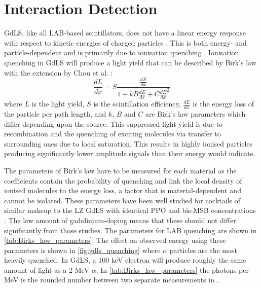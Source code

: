 \section{Interaction Detection}
\label{sec:od_physics}
\par
GdLS, like all LAB-based scintillators, does not have a linear energy response with respect to kinetic energies of charged particles \cite{nonlinear_gdls_ref}.
This is both energy- and particle-dependent and is primarily due to ionisation quenching \cite{lab_quenching_theory_ref}.
Ionisation quenching in GdLS will produce a light yield that can be described by Birk's law \cite{birks_law_ref} with the extension by Chou et al. \cite{generalised_birks_ref}:
\begin{equation} 
    \frac{dL}{dx} = S \frac{\frac{dE}{dx}}{1 + kB\frac{dE}{dx} + C\frac{dE}{dx}^2}
    \label{eq:birkslaw}
\end{equation}
where $L$ is the light yield, $S$ is the scintillation efficiency, $\frac{dE}{dx}$ is the energy loss of the particle per path length, and $k$, $B$ and $C$ are Birk's law parameters which differ depending upon the source.
This suppressed light yield is due to recombination and the quenching of exciting molecules via transfer to surrounding ones due to local saturation.
This results in highly ionised particles producing significantly lower amplitude signals than their energy would indicate.

\par
The parameters of Birk's law have to be measured for each material as the coefficients contain the probability of quenching and link the local density of ionised molecules to the energy loss, a factor that is material-dependent and cannot be isolated.
These parameters have been well studied for cocktails of similar makeup to the LZ GdLS with identical PPO and bis-MSB concentrations \cite{ls_alpha_quenching_ref,ls_proton_quenching_ref}.
The low amount of gadolinium-doping means that these should not differ significantly from those studies.
The parameters for LAB quenching are shown in \autoref{tab:Birks_law_parameters}.
The effect on observed energy using these parameters is shown in \autoref{fig:gdls_quenching} where $\alpha$ particles are the most heavily quenched.
In GdLS, a 100 keV electron will produce roughly the same amount of light as a 2 MeV $\alpha$.
In \autoref{tab:Birks_law_parameters} the photons-per-MeV is the rounded number between two separate measurements in \cite{scotthaselschwardt_thesis_ref}.

